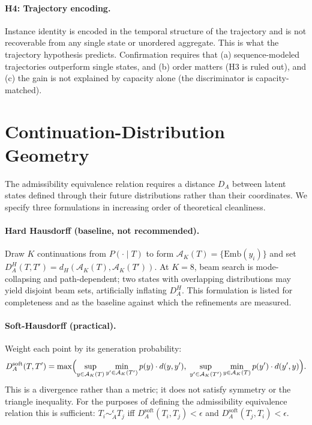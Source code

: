 \documentclass[11pt]{article}
\begin{document}
\paragraph{H4: Trajectory encoding.} Instance identity is encoded in the temporal structure of
the trajectory and is not recoverable from any single state or unordered aggregate. This is what
the trajectory hypothesis predicts. Confirmation requires that (a) sequence-modeled trajectories
outperform single states, and (b) order matters (H3 is ruled out), and (c) the gain is not
explained by capacity alone (the discriminator is capacity-matched).

\section{Continuation-Distribution Geometry}
\label{sec:geometry}

The admissibility equivalence relation requires a distance $D_A$ between latent states defined
through their future distributions rather than their coordinates. We specify three formulations
in increasing order of theoretical cleanliness.

\paragraph{Hard Hausdorff (baseline, not recommended).} Draw $K$ continuations from
$P(\cdot \mid T)$ to form $\mathcal{A}_K(T) = \{\mathrm{Emb}(y_i)\}$ and set
$D_A^H(T,T') = d_H(\mathcal{A}_K(T), \mathcal{A}_K(T'))$. At $K = 8$, beam search is
mode-collapsing and path-dependent; two states with overlapping distributions may yield disjoint
beam sets, artificially inflating $D_A^H$. This formulation is listed for completeness and as
the baseline against which the refinements are measured.

\paragraph{Soft-Hausdorff (practical).} Weight each point by its generation probability:
\begin{equation}
D_A^{\mathrm{soft}}(T, T') = \max\Bigl(
\sup_{y \in \mathcal{A}_K(T)} \min_{y' \in \mathcal{A}_K(T')} p(y)\cdot d(y, y'),\;
\sup_{y' \in \mathcal{A}_K(T')} \min_{y \in \mathcal{A}_K(T)} p(y')\cdot d(y', y)\Bigr).
\end{equation}
This is a divergence rather than a metric; it does not satisfy symmetry or the triangle
inequality. For the purposes of defining the admissibility equivalence relation this is
sufficient: $T_i \sim_A^\epsilon T_j$ iff $D_A^{\mathrm{soft}}(T_i, T_j) < \epsilon$ and
$D_A^{\mathrm{soft}}(T_j, T_i) < \epsilon$.
\end{document}
